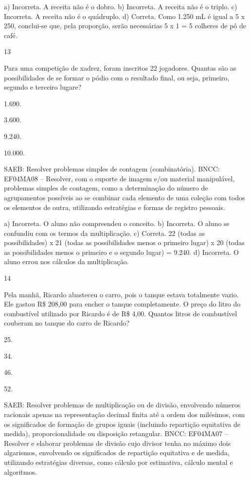 \begin{mdframed}[linewidth=2pt,linecolor=salmao,roundcorner=2pt]
\begin{escolha}
{\begin{escolha}
a) Incorreta. A receita não é o dobro.
b) Incorreta. A receita não é o triplo.
c) Incorreta. A receita não é o quádruplo.
d) Correta. Como 1.250 mL é igual a 5 x 250, conclui-se que, pela proporção, serão necessárias 5 x 1 = 5 colheres de pó de café.

\num{13}

Para uma competição de xadrez, foram inscritos 22 jogadores. Quantas são
as possibilidades de se formar o pódio com o resultado final, ou seja,
primeiro, segundo e terceiro lugare?

\begin{escolha}
\item
  1.690.
\item
  3.600.
\item
  9.240.
\item
  10.000.
\end{escolha}

SAEB: Resolver problemas simples de contagem (combinatória).
BNCC: EF04MA08 -- Resolver, com o suporte de imagem e/ou material manipulável, problemas simples
de contagem, como a determinação do número de agrupamentos possíveis ao se combinar cada
elemento de uma coleção com todos os elementos de outra, utilizando estratégias e formas de
registro pessoais.

a) Incorreta. O aluno não compreendeu o conceito.
b) Incorreta. O aluno se confundiu com os termos da multiplicação.
c) Correta. 22 (todas as possibilidades) x 21 (todas as possibilidades menos o primeiro lugar) x 20 (todas as possibilidades menos o primeiro e o segundo lugar) = 9.240.
d) Incorreta. O aluno errou nos cálculos da multiplicação.

\num{14}

Pela manhã, Ricardo abasteceu o carro, pois o tanque estava totalmente
vazio. Ele gastou R\$ 208,00 para encher o tanque completamente.
O preço do litro do combustível utilizado por Ricardo
é de R\$ 4,00. Quantos litros de combustível couberam no tanque do carro de
Ricardo?

\begin{escolha}
\item
  25.
\item
  34.
\item
  46.
\item
  52.
\end{escolha}

SAEB: Resolver problemas de multiplicação ou de divisão,
envolvendo números racionais apenas na representação decimal finita até
a ordem dos milésimos, com os significados de formação de grupos iguais
(incluindo repartição equitativa de medida), proporcionalidade ou
disposição retangular.
BNCC: EF04MA07 -- Resolver e elaborar problemas de divisão cujo divisor tenha no máximo dois algarismos,
envolvendo os significados de repartição equitativa e de medida, utilizando estratégias diversas,
como cálculo por estimativa, cálculo mental e algoritmos.


\end{escolha}}
\end{escolha}
\end{mdframed}
